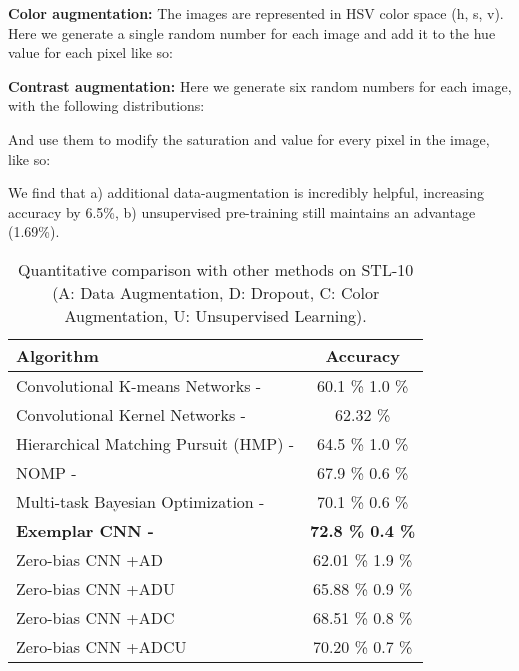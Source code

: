 \documentclass{article} \usepackage{iclr2015,times}
\begin{document}
\textbf{Color augmentation:}
The images are represented in HSV color space (h, s, v). Here we generate a single random number for each image and add it to the hue value for each pixel like so:


\textbf{Contrast augmentation:} 
Here we generate six random numbers for each image, with the following distributions:


And use them to modify the saturation and value for every pixel in the image, like so:


We find that a) additional data-augmentation is incredibly helpful, increasing accuracy by 6.5\%, b) unsupervised pre-training still maintains an advantage (1.69\%).

\begin{table}
\begin{center}
    \caption{Quantitative comparison with other methods on STL-10 (A: Data Augmentation, D: Dropout, C: Color Augmentation, U: Unsupervised Learning).}
    \label{tab:method_comp_stl}
    \begin{tabular}{ |l | c |}
    \hline
    Algorithm & Accuracy \\ \hline    
    Convolutional K-means Networks - \citet{coates2011selecting} & 60.1 \%  1.0 \% \\ Convolutional Kernel Networks - \citet{Mairal2014convolutional} & 62.32 \% \\ Hierarchical Matching Pursuit (HMP) - \citet{bo2013unsupervised} & 64.5 \%  1.0 \% \\ NOMP - \citet{lin2014stable} & 67.9 \%  0.6 \% \\Multi-task Bayesian Optimization - \citet{swersky2013multi} & 70.1 \%  0.6 \% \\ \textbf{Exemplar CNN - \citet{dosovitskiy2014discriminative}} & \textbf{72.8 \%  0.4 \% }\\ \hline
    \hline
     Zero-bias CNN +AD &  62.01 \%  1.9 \% \\ \hline
     Zero-bias CNN +ADU &  65.88 \%  0.9 \% \\ \hline
     Zero-bias CNN +ADC & 68.51 \%  0.8 \% \\ \hline
     Zero-bias CNN +ADCU & 70.20 \%  0.7 \% \\ 
    \hline
    \end{tabular}
\end{center}
\end{table}
 
\end{document}
